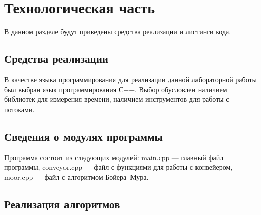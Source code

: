 \chapter{Технологическая часть}

В данном разделе будут приведены средства реализации и листинги кода.


\section{Средства реализации}

В качестве языка программирования для реализации данной лабораторной работы был выбран язык программирования С++. 
Выбор обусловлен наличием библиотек для измерения времени, наличием инструментов для работы с потоками.


\section{Сведения о модулях программы}
Программа состоит из следующих модулей:
main.сpp --- главный файл программы,
conveyor.cpp --- файл с функциями для работы с конвейером,
moor.cpp --- файл с алгоритмом Бойера--Мура.


\section{Реализация алгоритмов}

